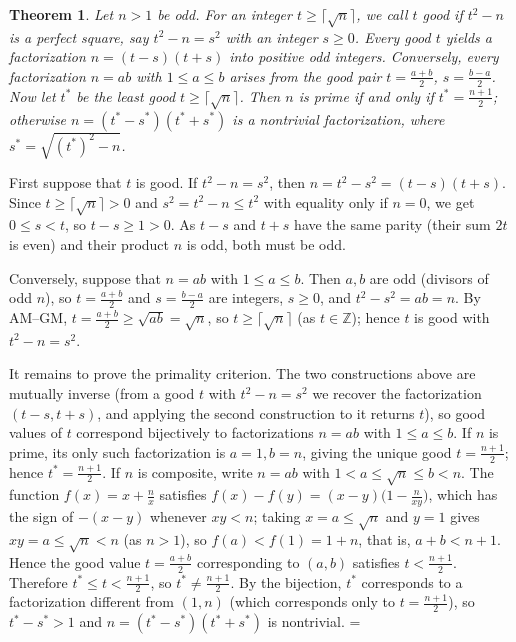 \documentclass[11pt]{article}
\makeatletter
\let\nt@closedisplay\]
\def\nt@guardedclose{\@ifnextchar\par{\nt@closeafterpar}{\@ifnextchar\end{\postdisplaypenalty\@M\nt@closedisplay}{\nt@closedisplay}}}
\def\nt@closeafterpar\par{\@ifnextchar\par{\nt@closeafterpar}{\@ifnextchar\end{\postdisplaypenalty\@M\nt@closedisplay\par}{\nt@closedisplay\par}}}
\renewenvironment{proof}[1][\proofname]{\par
  \pushQED{\qed}\normalfont\topsep\medskipamount\edef\nt@afterproof{\@endparpenalty=\the\@endparpenalty\relax}\@beginparpenalty\@M\@endparpenalty\@M\let\]\nt@guardedclose\trivlist\item[]\textit{#1\@addpunct{.}} \ignorespaces}{\ifvmode\addpenalty\@M\fi\popQED\nt@afterproof\endtrivlist\@endpefalse}
\theoremstyle{ntstyle}
\newtheorem{theorem}{Theorem}[subsection]
\makeatother
\begin{document}
\begin{theorem}\label{thm:9.5.1}
  Let $n>1$ be odd. For an integer $t \ge \lceil\sqrt {n}\rceil$, we call $t$ good if $t^2-n$ is a perfect square,
  say
  $t^2 - n = s^2$ with an integer $s \ge 0$. Every good $t$ yields a factorization
  $n = (t-s)(t+s)$ into positive odd integers. Conversely, every
  factorization $n = ab$ with $1 \le a \le b$ arises from the good pair
  $t = \tfrac{a+b}{2}$, $s = \tfrac{b-a}{2}$. Now let
  $t^{*}$ be the least good $t \ge \lceil\sqrt{n}\rceil$. Then $n$ is prime
  if and only if $t^{*} = \tfrac{n+1}{2}$; otherwise $n = (t^{*}-s^{*})(t^{*}+s^{*})$ is a nontrivial factorization, where
  $s^{*} = \sqrt{(t^{*})^2-n}$.

\end{theorem}

\begin{proof} First suppose that $t$ is good. If $t^2-n=s^2$, then
  $n=t^2-s^2=(t-s)(t+s)$. Since $t\ge\lceil\sqrt {n}\rceil>0$ and $s^2=t^2-n\le t^2$ with equality only if $n=0$, we get
  $0\le s<t$, so $t-s\ge1>0$. As $t-s$ and $t+s$ have the same parity
  (their sum $2t$ is even) and their product $n$ is odd, both must be odd.

  Conversely, suppose that $n=ab$ with $1\le a\le b$. Then
  $a,b$ are odd (divisors of odd $n$), so $t=\tfrac{a+b}{2}$ and
  $s=\tfrac{b-a}{2}$ are integers, $s\ge0$, and $t^2-s^2=ab=n$. By AM--GM,
  $t=\tfrac{a+b}{2}\ge\sqrt{ab}=\sqrt{n}$, so $t\ge\lceil\sqrt{n}\rceil$ (as
  $t\in\mathbb{Z}$); hence $t$ is good with $t^2-n=s^2$.

  It remains to prove the primality criterion. The two constructions above are mutually
  inverse (from a good $t$ with $t^2-n=s^2$ we recover the
  factorization $(t-s,t+s)$, and applying the second construction to it
  returns $t$), so good values of $t$ correspond bijectively to
  factorizations $n=ab$ with $1\le a\le b$. If $n$ is prime, its only
  such factorization is $a=1,b=n$, giving the unique good
  $t=\tfrac{n+1}{2}$; hence $t^*=\tfrac{n+1}{2}$. If $n$ is composite,
  write $n=ab$ with $1<a\le\sqrt{n}\le b<n$. The function $f(x)=x+\tfrac{n}{x}$ satisfies
  $f(x)-f(y)=(x-y)\big(1-\tfrac{n}{xy}\big)$, which has
  the sign of $-(x-y)$ whenever $xy<n$; taking $x=a\le\sqrt{n}$ and
  $y=1$ gives $xy=a\le\sqrt{n}<n$ (as $n>1$), so $f(a)<f(1)=1+n$, that is, $a+b<n+1$. Hence the good value
  $t=\tfrac{a+b}{2}$ corresponding to $(a,b)$
  satisfies $t<\tfrac{n+1}{2}$. Therefore $t^*\le t<\tfrac{n+1}{2}$, so
  $t^*\neq\tfrac{n+1}{2}$. By the bijection, $t^*$ corresponds to a
  factorization different from $(1,n)$ (which corresponds only to
  $t=\tfrac{n+1}{2}$), so $t^*-s^*>1$ and $n=(t^*-s^*)(t^*+s^*)$ is
  nontrivial.
\end{proof}
\end{document}
